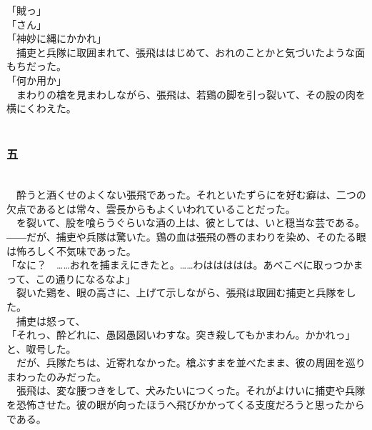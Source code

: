 \documentclass[
  paper=a5,
  fontsize=10pt,
  jafontsize=9.5pt,
  tate,                  %
  open_bracket_pos=nibu, %
]{jlreq}
\begin{document}
「賊っ」\\


「さん」\\


「神妙に縄にかかれ」\\


　捕吏と兵隊に取囲まれて、張飛ははじめて、おれのことかと気づいたような面もちだった。\\


「何か用か」\\


　まわりの槍を見まわしながら、張飛は、若鶏の脚を引っ裂いて、その股の肉を横にくわえた。\\

\\

\subsubsection{五}

\\


　酔うと酒くせのよくない張飛であった。それといたずらにを好む癖は、二つの欠点であるとは常々、雲長からもよくいわれていることだった。\\


　を裂いて、股を喰らうぐらいな酒の上は、彼としては、いと穏当な芸である。――だが、捕吏や兵隊は驚いた。鶏の血は張飛の唇のまわりを染め、そのたる眼は怖ろしく不気味であった。\\


「なに？　……おれを捕まえにきたと。……わははははは。あべこべに取っつかまって、この通りになるなよ」\\


　裂いた鶏を、眼の高さに、上げて示しながら、張飛は取囲む捕吏と兵隊をした。\\


　捕吏は怒って、\\


「それっ、酔どれに、愚図愚図いわすな。突き殺してもかまわん。かかれっ」と、呶号した。\\


　だが、兵隊たちは、近寄れなかった。槍ぶすまを並べたまま、彼の周囲を巡りまわったのみだった。\\


　張飛は、変な腰つきをして、犬みたいにつくった。それがよけいに捕吏や兵隊を恐怖させた。彼の眼が向ったほうへ飛びかかってくる支度だろうと思ったからである。\\
\end{document}
